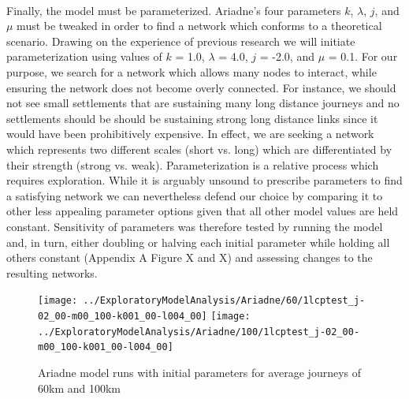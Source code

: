 \documentclass[12pt,a4paper]{thesis}
\begin{document}
\paragraph{}
Finally, the model must be parameterized. Ariadne's four parameters $k$, $\lambda$, $j$, and $\mu$ must be tweaked in order to find a network which conforms to a theoretical scenario. Drawing on the experience of previous research \citep{KnaRivEva11} we will initiate parameterization using values of $k$ = 1.0, $\lambda$ = 4.0, $j$ = -2.0, and $\mu$ = 0.1. For our purpose, we search for a network which allows many nodes to interact, while ensuring the network does not become overly connected. For instance, we should not see small settlements that are sustaining many long distance journeys and no settlements should be should be sustaining strong long distance links since it would have been prohibitively expensive. In effect, we are seeking a network which represents two different scales (short vs. long) which are differentiated by their strength (strong vs. weak). Parameterization is a relative process which requires exploration. While it is arguably unsound to prescribe parameters to find a satisfying network we can nevertheless defend our choice by comparing it to other less appealing parameter options given that all other model values are held constant. Sensitivity of parameters was therefore tested by running the model and, in turn, either doubling or halving each initial parameter while holding all others constant (Appendix A Figure X and X) and assessing changes to the resulting networks.

\begin{figure}
\centering
\texttt{[image: ../ExploratoryModelAnalysis/Ariadne/60/1lcptest\_j-02\_00-m00\_100-k001\_00-l004\_00]}
\texttt{[image: ../ExploratoryModelAnalysis/Ariadne/100/1lcptest\_j-02\_00-m00\_100-k001\_00-l004\_00]}
\caption{Ariadne model runs with initial parameters for average journeys of 60km and 100km}
\label{fig:initParams}
\end{figure}
\end{document}
